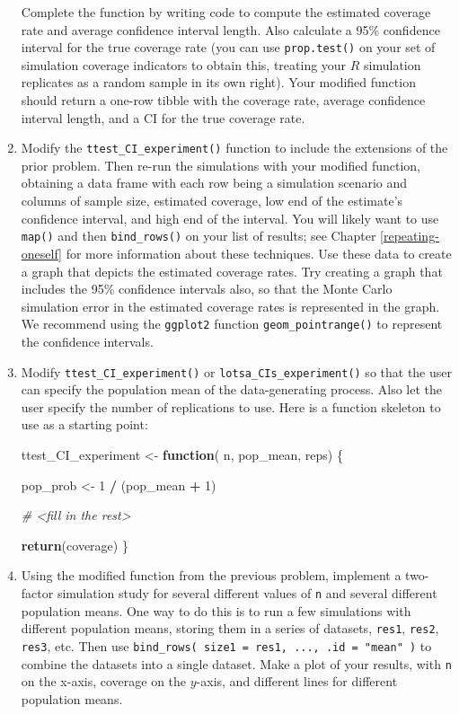 \documentclass[
]{book}
\newenvironment{Shaded}{\begin{snugshade}}{\end{snugshade}}
\newcommand{\CommentTok}[1]{\textcolor[rgb]{0.56,0.35,0.01}{\textit{#1}}}
\newcommand{\ControlFlowTok}[1]{\textcolor[rgb]{0.13,0.29,0.53}{\textbf{#1}}}
\newcommand{\DecValTok}[1]{\textcolor[rgb]{0.00,0.00,0.81}{#1}}
\newcommand{\FunctionTok}[1]{\textcolor[rgb]{0.13,0.29,0.53}{\textbf{#1}}}
\newcommand{\NormalTok}[1]{#1}
\newcommand{\OtherTok}[1]{\textcolor[rgb]{0.56,0.35,0.01}{#1}}
\newcommand{\SpecialCharTok}[1]{\textcolor[rgb]{0.81,0.36,0.00}{\textbf{#1}}}
\begin{document}
\begin{enumerate}
  Complete the function by writing code to compute the estimated coverage rate and average confidence interval length. Also calculate a 95\% confidence interval for the true coverage rate (you can use \texttt{prop.test()} on your set of simulation coverage indicators to obtain this, treating your \(R\) simulation replicates as a random sample in its own right). Your modified function should return a one-row tibble with the coverage rate, average confidence interval length, and a CI for the true coverage rate.
\item
  Modify the \texttt{ttest\_CI\_experiment()} function to include the extensions of the prior problem. Then re-run the simulations with your modified function, obtaining a data frame with each row being a simulation scenario and columns of sample size, estimated coverage, low end of the estimate's confidence interval, and high end of the interval. You will likely want to use \texttt{map()} and then \texttt{bind\_rows()} on your list of results; see Chapter \ref{repeating-oneself} for more information about these techniques.
  Use these data to create a graph that depicts the estimated coverage rates. Try creating a graph that includes the 95\% confidence intervals also, so that the Monte Carlo simulation error in the estimated coverage rates is represented in the graph. We recommend using the \texttt{ggplot2} function \texttt{geom\_pointrange()} to represent the confidence intervals.
\item
  Modify \texttt{ttest\_CI\_experiment()} or \texttt{lotsa\_CIs\_experiment()} so that the user can specify the population mean of the data-generating process. Also let the user specify the number of replications to use. Here is a function skeleton to use as a starting point:

\begin{Shaded}
\begin{Highlighting}[]
\NormalTok{ttest\_CI\_experiment }\OtherTok{\textless{}{-}} \ControlFlowTok{function}\NormalTok{( n, pop\_mean, reps) \{}

\NormalTok{  pop\_prob }\OtherTok{\textless{}{-}} \DecValTok{1} \SpecialCharTok{/}\NormalTok{ (pop\_mean }\SpecialCharTok{+} \DecValTok{1}\NormalTok{)}

  \CommentTok{\# \textless{}fill in the rest\textgreater{}}

  \FunctionTok{return}\NormalTok{(coverage)}
\NormalTok{\}}
\end{Highlighting}
\end{Shaded}
\item
  Using the modified function from the previous problem, implement a two-factor simulation study for several different values of \texttt{n} and several different population means.
  One way to do this is to run a few simulations with different population means, storing them in a series of datasets, \texttt{res1}, \texttt{res2}, \texttt{res3}, etc.
  Then use \texttt{bind\_rows(\ size1\ =\ res1,\ ...,\ .id\ =\ "mean"\ )} to combine the datasets into a single dataset.
  Make a plot of your results, with \texttt{n} on the x-axis, coverage on the \(y\)-axis, and different lines for different population means.
\end{enumerate}
\end{document}
